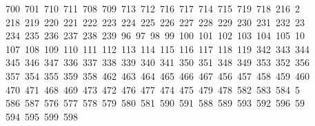 \begin{tabbing}
\ 700\ 701\ 710\ 711\ 708\ 709\ 713\ 712\ 716\ 717\ 714\ 715\ 719\ 718\ 216\ 2\\[0pt]
\ 218\ 219\ 220\ 221\ 222\ 223\ 224\ 225\ 226\ 227\ 228\ 229\ 230\ 231\ 232\ 23\\[0pt]
\ 234\ 235\ 236\ 237\ 238\ 239\ 96\ 97\ 98\ 99\ 100\ 101\ 102\ 103\ 104\ 105\ 10\\[0pt]
\ 107\ 108\ 109\ 110\ 111\ 112\ 113\ 114\ 115\ 116\ 117\ 118\ 119\ 342\ 343\ 344\\[0pt]
\>\ 345\ 346\ 347\ 336\ 337\ 338\ 339\ 340\ 341\ 350\ 351\ 348\ 349\ 353\ 352\ 356\\[0pt]
\>\ 357\ 354\ 355\ 359\ 358\ 462\ 463\ 464\ 465\ 466\ 467\ 456\ 457\ 458\ 459\ 460\ \\[0pt]
\ 470\ 471\ 468\ 469\ 473\ 472\ 476\ 477\ 474\ 475\ 479\ 478\ 582\ 583\ 584\ 5\\[0pt]
\ 586\ 587\ 576\ 577\ 578\ 579\ 580\ 581\ 590\ 591\ 588\ 589\ 593\ 592\ 596\ 59\\[0pt]
\ 594\ 595\ 599\ 598\ \\[0pt]

\end{tabbing}
